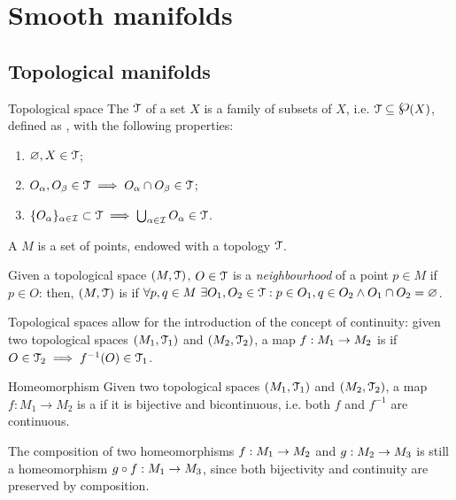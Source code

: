 
\section{Smooth manifolds}
\label{sec:manifolds}

\subsection{Topological manifolds}

\begin{definition}{Topological space}{}
  The  $ \EuScript{T} $ of a set $ X $ is a family of subsets of $ X $, i.e. $ \tp \subseteq \pwst{X} $, defined as , with the following properties:
  \begin{enumerate}
    \item $ \varnothing,X \in \EuScript{T} $;
    \item $ O_{\alpha},O_{\beta} \in \EuScript{T} \implies O_{\alpha}\cap O_{\beta} \in \EuScript{T} $;
    \item $ \{O_{\alpha}\}_{\alpha \in \mathcal{I}} \subset \EuScript{T} \implies \bigcup_{\alpha \in \mathcal{I}} O_{\alpha} \in \EuScript{T} $.
  \end{enumerate}
  A  $ M $ is a set of points, endowed with a topology $ \EuScript{T} $.
\end{definition}

Given a topological space $ (M,\EuScript{T}) $, $ O \in \EuScript{T} $ is a \emph{neighbourhood} of a point $ p \in M $ if $ p \in O $: then, $ (M,\EuScript{T}) $ is  if $ \forall p,q \in M \,\, \exists O_1, O_2 \in \EuScript{T} : p \in O_1 , q \in O_2 \land O_1 \cap O_2 = \varnothing $.

Topological spaces allow for the introduction of the concept of continuity: given two topological spaces $ (M_1, \EuScript{T}_1) $ and $ (M_2, \EuScript{T}_2) $, a map $ f : M_1 \rightarrow M_2 $ is  if $ O \in \EuScript{T}_2 \implies f^{-1}(O)\in \EuScript{T}_1 $.

\begin{definition}{Homeomorphism}{}
  Given two topological spaces $ (M_1, \EuScript{T}_1) $ and $ (M_2, \EuScript{T}_2) $, a map $ f : M_1 \rightarrow M_2 $ is a  if it is bijective and bicontinuous, i.e. both $ f $ and $ f^{-1} $ are continuous.
\end{definition}

The composition of two homeomorphisms $ f : M_1 \rightarrow M_2 $ and $ g : M_2 \rightarrow M_3 $ is still a homeomorphism $ g \circ f : M_1 \rightarrow M_3 $, since both bijectivity and continuity are preserved by composition.

